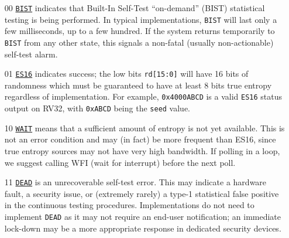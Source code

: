 \begin{itemize}
    \item[00]   \underline{\tt BIST}
    indicates that Built-In Self-Test ``on-demand'' (BIST) statistical
    testing is being performed. In typical implementations,
    \verb|BIST| will last only a few milliseconds, up to a few hundred.
    If the system returns temporarily to \verb|BIST| from any other state,
    this signals a non-fatal (usually non-actionable) self-test alarm.

    \item[01]   \underline{\tt ES16}
    indicates success; the low bits \verb|rd[15:0]| will have 16 bits
    of randomness which must be guaranteed to have at least 8 bits true
    entropy regardless of implementation. For example, \verb|0x4000ABCD|
    is a valid \verb|ES16| status output on RV32, with \verb|0xABCD| being
    the \verb|seed| value.

    \item[10]   \underline{\tt WAIT}
    means that a sufficient amount of entropy is not yet available.
    This is not an error condition and may (in fact) be more frequent than
    ES16, since true entropy sources may not have very high bandwidth.
    If polling in a loop, we suggest calling WFI (wait for interrupt)
    before the next poll.

    \item[11]   \underline{\tt DEAD}
    is an unrecoverable self-test error. This may indicate a hardware
    fault, a security issue, or (extremely rarely) a type-1
    statistical false positive in the continuous testing procedures.
    Implementations do not need to implement \verb|DEAD| as it may not require
    an end-user notification; an immediate lock-down may be a more
    appropriate response in dedicated security devices.
\end{itemize}

